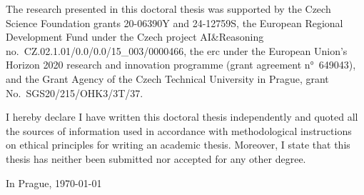 \begin{thanks}
The research presented in this doctoral thesis was supported by
the Czech Science Foundation grants 20-06390Y and 24-12759S,
the European Regional Development Fund under the Czech project AI\&Reasoning no.~CZ.02.1.01/0.0/0.0/15\_003/0000466,
the \gls{erc} under the European Union's Horizon 2020 research and innovation programme (grant agreement n°~649043), and
the Grant Agency of the Czech Technical University in Prague, grant No.~SGS20/215/OHK3/3T/37.
\end{thanks}

\begin{declaration}
I hereby declare I have written this doctoral thesis independently and quoted all the sources of information used in accordance with methodological instructions on ethical principles for writing an academic thesis. Moreover, I state that this thesis has neither been submitted nor accepted for any other degree.

In Prague, \today
\end{declaration}

\begin{abstract-english}



\end{abstract-english}

\begin{abstract-czech}

\end{abstract-czech}


\hypersetup{hidelinks}
